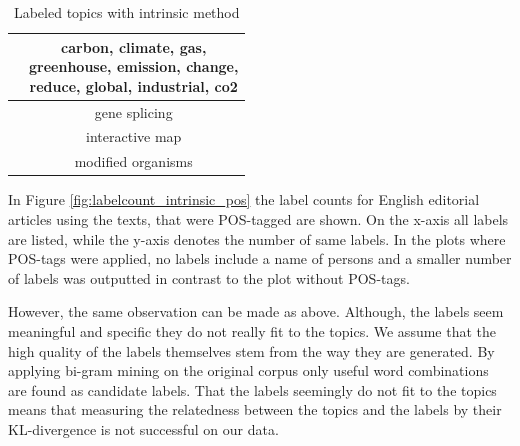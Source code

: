 {\begin{table}[h]
\begin{minipage}[t]{0.5\textwidth}
\begin{tabular}{c|c}
			& \thead{carbon, climate, gas,\\ 	greenhouse, emission, change,\\ 	reduce, 	global, 	industrial, 	co2} \\
			\hline
			& gene splicing  \\
			& interactive map   \\
			& modified organisms\\
		\end{tabular}
	\end{minipage}
	\caption[Labeled topics according with intrinsic method]{Labeled topics with intrinsic method}
	\label{tab:intrinsic_label_pos}
\end{table}

In Figure \ref{fig:labelcount_intrinsic_pos} the label counts for English editorial articles using the texts, that were \ac{POS}-tagged are shown. On the x-axis all labels are listed, while the y-axis denotes the number of same labels. 
In the plots where \ac{POS}-tags were applied, no labels include a name of persons and a smaller number of labels was outputted in contrast to the plot without \ac{POS}-tags. 

However, the same observation can be made as above. Although, the labels seem meaningful and specific they do not really fit to the topics. We assume that the high quality of the labels themselves stem from the way they are generated. By applying bi-gram mining on the original corpus only useful word combinations are found as candidate labels. That the labels seemingly do not fit to the topics means that measuring the relatedness between the topics and the labels by their KL-divergence is not successful on our data.

}
